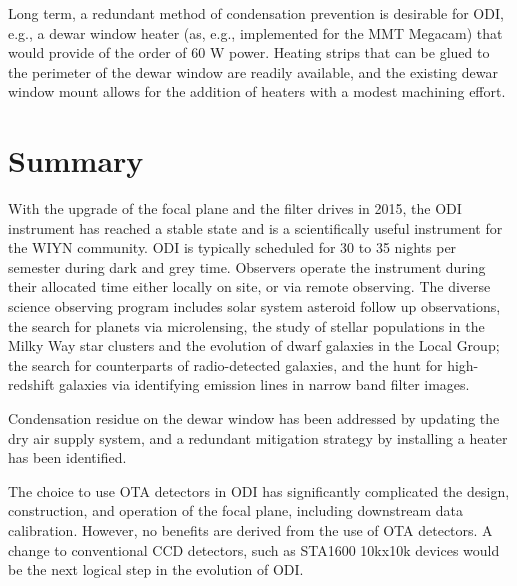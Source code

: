 \documentclass[]{spieman}
\begin{document}
Long term, a redundant method of condensation prevention is desirable for
ODI, e.g., a dewar window heater (as, e.g., implemented for the MMT 
Megacam\cite{McLeod2015}) that would provide of the
order of 60 W power. Heating strips that can be glued to the perimeter of the
dewar window are readily available, and the existing dewar window mount allows
for the addition of heaters with a modest machining effort.


\section{Summary}

With the upgrade of the focal plane and the filter drives in 2015, the ODI
instrument has reached a stable state and is a scientifically useful instrument
for the WIYN community. ODI is typically scheduled for 30 to 35 nights per
semester during dark and grey time. Observers operate the instrument during
their allocated time either locally on site, or via remote observing. The
diverse science observing program includes solar system asteroid follow up
observations, the search for planets via microlensing, the study of stellar
populations in the  Milky Way star clusters and the evolution of dwarf galaxies
in the Local Group; the search for  counterparts of radio-detected galaxies, and
the hunt for high-redshift galaxies via identifying emission lines in narrow
band filter images.

Condensation residue on the dewar window has been addressed by updating the
dry air supply system, and a redundant  mitigation strategy by installing
a heater has been identified. 

The choice to use  OTA detectors in ODI has significantly complicated the
design, construction, and operation of the focal plane, including downstream
data calibration. However, no benefits are derived from the use of OTA
detectors.  A change to conventional CCD detectors, such as STA1600 10kx10k
devices would be the next logical step in the evolution of ODI.



 

\end{document}
